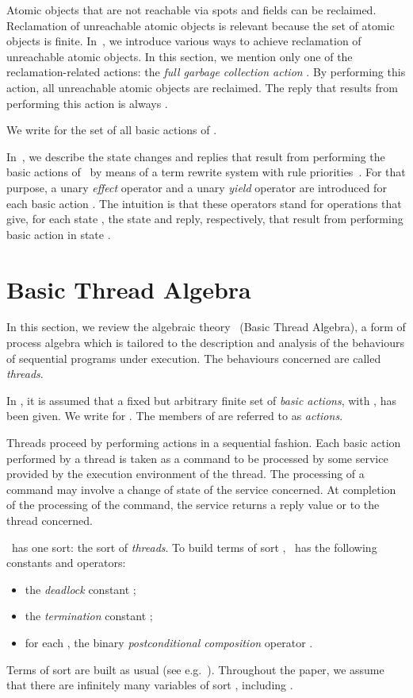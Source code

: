 \documentclass[fleqn]{llncs}
\begin{document}
Atomic objects that are not reachable via spots and fields can be
reclaimed.
Reclamation of unreachable atomic objects is relevant because the set
 of atomic objects is finite.
In~\cite{BM08d}, we introduce various ways to achieve reclamation of
unreachable atomic objects.
In this section, we mention only one of the reclamation-related actions:
the \emph{full garbage collection action} .
By performing this action, all unreachable atomic objects are reclaimed.
The reply that results from performing this action is always .

We write  for the set of all basic actions of \DLD.

In~\cite{BM08d}, we describe the state changes and replies that result
from performing the basic actions of \DLD\ by means of a term rewrite
system with rule priorities~\cite{BBKW89a}.
For that purpose, a unary \emph{effect} operator  and a
unary \emph{yield} operator  are introduced for each
basic action .
The intuition is that these operators stand for operations that give,
for each state , the state and reply, respectively, that result from
performing basic action  in state .

\section{Basic Thread Algebra}
\label{sect-BTA}

In this section, we review the algebraic theory \BTA\ (Basic Thread
Algebra), a form of process algebra which is tailored to the description
and analysis of the behaviours of sequential programs under execution.
The behaviours concerned are called \emph{threads}.

In \BTA, it is assumed that a fixed but arbitrary finite set  of
\emph{basic actions}, with , has been given.
We write  for .
The members of  are referred to as \emph{actions}.

Threads proceed by performing actions in a sequential fashion.
Each basic action performed by a thread is taken as a command to be
processed by some service provided by the execution environment of the
thread.
The processing of a command may involve a change of state of the service
concerned.
At completion of the processing of the command, the service returns a
reply value  or  to the thread concerned.

\BTA\ has one sort: the sort  of \emph{threads}.
To build terms of sort , \BTA\ has the following constants and
operators:
\begin{itemize}
\item
the \emph{deadlock} constant ;
\item
the \emph{termination} constant ;
\item
for each ,
the binary \emph{postconditional composition} operator
.
\end{itemize}
Terms of sort  are built as usual (see e.g.~\cite{Wir90a,ST99a}).
Throughout the paper, we assume that there are infinitely many variables
of sort , including .
\end{document}
